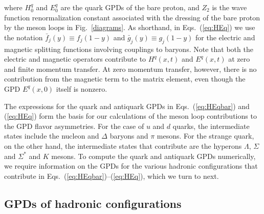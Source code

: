 \documentclass[preprintnumbers,prd,superscriptaddress,preprint]{revtex4-1}
\begin{document}
%
where $H^q_0$ and $E^q_0$ are the quark GPDs of the bare proton, and $Z_2$ is the wave function renormalization constant associated with the dressing of the bare proton by the meson loops in Fig.~\ref{diagrams}.
As shorthand, in Eqs.~(\ref{eq:HEq}) we use the notation $\bar{f}_j(y) \equiv f_j(1-y)$ and $\bar{g}_j(y) \equiv g_j(1-y)$ for the electric and magnetic splitting functions involving couplings to baryons.
%
Note that both the electric and magnetic operators contribute to $H^q(x,t)$ and $E^q(x,t)$ at zero and finite momentum transfer.
At zero momentum transfer, however, there is no contribution from the magnetic term to the matrix element, even though the GPD $E^q(x,0)$ itself is nonzero. 


The expressions for the quark and antiquark GPDs in Eqs.~(\ref{eq:HEqbar}) and (\ref{eq:HEq}) form the basis for our calculations of the meson loop contributions to the GPD flavor asymmetries.
For the case of $u$ and $d$ quarks, the intermediate states include the nucleon and $\Delta$ baryons and $\pi$ mesons.
For the strange quark, on the other hand, the intermediate states that contribute are the hyperons $\Lambda$, $\Sigma$ and $\Sigma^*$ and $K$ mesons.
To compute the quark and antiquark GPDs numerically, we require information on the GPDs for the various hadronic configurations that contribute in Eqs.~(\ref{eq:HEqbar})--(\ref{eq:HEq}), which we turn to next.


\subsection{GPDs of hadronic configurations}
\label{ssec.gpdhad}
\end{document}
